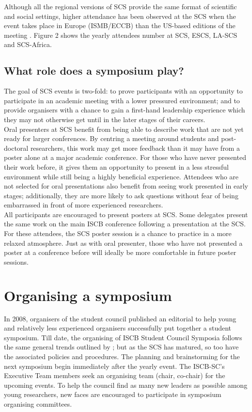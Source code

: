\documentclass[]{article}%
\begin{document}
	
	Although all the regional versions of SCS provide the same format of scientific and social settings, higher attendance has been observed at the SCS when the event takes place in Europe (ISMB/ECCB) than the US-based editions of the meeting \citep{cuypers2016}. Figure 2 shows the yearly attendees number at SCS, ESCS, LA-SCS and SCS-Africa. \\
	\subsection*{What role does a symposium play?}
	
	The goal of SCS events is two-fold: to prove participants with an opportunity to participate in an academic meeting with a lower pressured environment; and to provide organisers with a chance to gain a first-hand leadership experience which they may not otherwise get until in the later stages of their careers.\\
	
	Oral presenters at SCS benefit from being able to describe work that are not yet ready for larger conferences. By centring a meeting around students and post-doctoral researchers, this work may get more feedback than it may have from a poster alone at a major academic conference.  For those who have never presented their work before, it gives them an opportunity to present in a less stressful environment while still being a highly beneficial experience.  Attendees who are not selected for oral presentations also benefit from seeing work presented in early stages; additionally, they are more likely to ask questions without fear of being embarrassed in front of more experienced researchers. \\
	
	All participants are encouraged to present posters at SCS. Some delegates present the same work on the main ISCB conference following a presentation at the SCS. For these attendees, the SCS poster session is a chance to practice in a more relaxed atmosphere. Just as with oral presenter, those who have not presented a poster at a conference before will ideally be more comfortable in future poster sessions. \\
	
	
	\section*{Organising a symposium}
	
	In 2008, organisers of the student council published an editorial to help young and relatively less experienced organisers successfully put together a student symposium. Till date, the organising of ISCB Student Council Symposia follows the same general trends outlined by \citet{corpas2008}; but as the SCS has matured, so too have the associated policies and procedures. The planning and brainstorming for the next symposium begin immediately after the yearly event. The ISCB-SC's Executive Team members seek an organising team (chair, co-chair) for the upcoming events. To help the council find as many new leaders as possible among young researchers, new faces are encouraged to participate in symposium organising committees.\\
	
\end{document}
